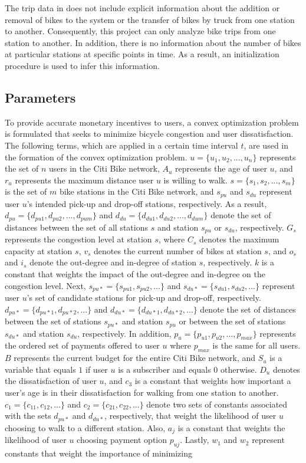 \documentclass[times, 10pt,twocolumn]{article}
\begin{document}
The trip data in \cite{dataset} does not include explicit information about the addition or removal of bikes to the system or the transfer of bikes by truck from one station to another. Consequently, this project can only analyze bike trips from one station to another. In addition, there is no information about the number of bikes at particular stations at specific points in time. As a result, an initialization procedure is used to infer this information. 

\subsection{Parameters}

To provide accurate monetary incentives to users, a convex optimization problem is formulated that seeks to minimize bicycle congestion and user dissatisfaction. The following terms, which are applied in a certain time interval $t$, are used in the formation of the convex optimization problem. $u = \{u_1, u_2, ..., u_n\}$ represents the set of $n$ users in the Citi Bike network, $A_u$ represents the age of user $u$, and $r_u$ represents the maximum distance user $u$ is willing to walk. $s = \{s_1, s_2, ..., s_m\}$ is the set of $m$ bike stations in the Citi Bike network, and $s_{pu}$ and $s_{du}$ represent user $u$'s intended pick-up and drop-off stations, respectively. As a result, $d_{pu} = \{d_{pu1}, d_{pu2}, ..., d_{pum}\}$ and $d_{du} = \{d_{du1}, d_{du2}, ..., d_{dum}\}$ denote the set of distances between the set of all stations $s$ and station $s_{pu}$ or $s_{du}$, respectively. $G_s$ represents the congestion level at station $s$, where $C_s$ denotes the maximum capacity at station $s$, $v_s$ denotes the current number of bikes at station $s$, and $o_s$ and $i_s$ denote the out-degree and in-degree of station $s$, respectively. $k$ is a constant that weights the impact of the out-degree and in-degree on the congestion level. Next, $s_{pu*} = \{s_{pu1}, s_{pu2}, ...\}$ and $s_{du*} = \{s_{du1}, s_{du2}, ...\}$ represent user $u$'s set of candidate stations for pick-up and drop-off, respectively. $d_{pu*} = \{d_{pu*1}, d_{pu*2}, ...\}$ and $d_{du*} = \{d_{du*1}, d_{du*2}, ...\}$ denote the set of distances between the set of stations $s_{pu*}$ and station $s_{pu}$ or between the set of stations $s_{du*}$ and station $s_{du}$, respectively. In addition, $p_u = \{p_{u1}, p_{u2}, ..., p_{max}\}$ represents the ordered set of payments offered to user $u$ where $p_{max}$ is the same for all users. $B$ represents the current budget for the entire Citi Bike network, and $S_u$ is a variable that equals $1$ if user $u$ is a subscriber and equals $0$ otherwise. $D_u$ denotes the dissatisfaction of user $u$, and $c_3$ is a constant that weights how important a user's age is in their dissatisfaction for walking from one station to another. $c_1 = \{c_{11}, c_{12}, ...\}$ and $c_2 = \{c_{21}, c_{22}, ...\}$ denote two sets of constants associated with the sets $d_{pu*}$ and $d_{du*}$, respectively, that weight the likelihood of user $u$ choosing to walk to a different station. Also, $a_j$ is a constant that weights the likelihood of user $u$ choosing payment option $p_{uj}$. Lastly, $w_1$ and $w_2$ represent constants that weight the importance of minimizing 
\end{document}
